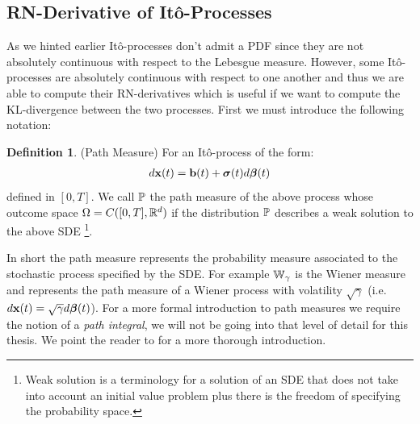\documentclass[a4paper,12pt,twoside,openright]{report}
\theoremstyle{definition}
\newtheorem{definition}{Definition}[section]
\begin{document}
\subsection{RN-Derivative of Itô-Processes}


As we hinted earlier Itô-processes don't admit a PDF since they are not absolutely continuous with respect to the Lebesgue measure. However, some Itô-processes are absolutely continuous with respect to one another and thus we are able to compute their RN-derivatives which is useful if we want to compute the KL-divergence between the two processes.  First we must introduce the following notation:
\begin{definition} (Path Measure) \label{def:pathmesu}
    For an Itô-process of the form:
    \begin{align*}
        d\rvx(t) = \rvb(t) + \rvsigma(t) d\rvw(t)
    \end{align*}
    defined in $[0,T]$. We call $\P$ the path measure of the above process whose outcome space $\Omega=C([0,T], \R^d)$ if the distribution $\P$ describes a weak solution to the above SDE \footnote{Weak solution is a terminology for a solution of an SDE that does not take into account an initial value problem plus there is the freedom of specifying the probability space.}.
\end{definition}

In short the path measure represents the probability measure associated to the stochastic process specified by the SDE.  For example $\W_{\gamma}$ is the Wiener measure and represents the path measure of a Wiener process with volatility $\sqrt{\gamma}$
 (i.e. $d\rvx(t) = \sqrt{\gamma} d \rvw(t)$). For a more formal introduction to path measures we require the notion of a \textit{path integral}, we will not be going into that level of detail for this thesis. We point the reader to \cite{sarkka2019applied, oksendal2003stochastic} for a more thorough introduction.
 
\end{document}
